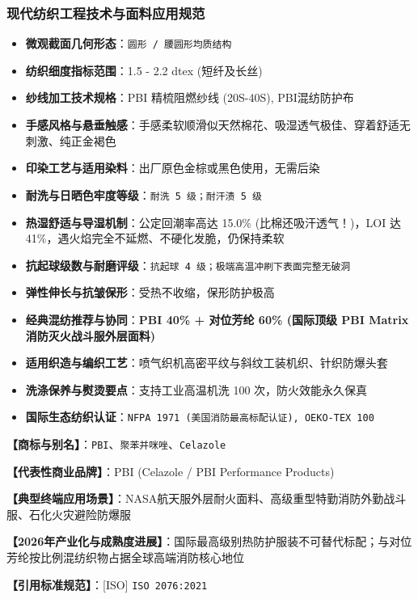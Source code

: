 \documentclass[11pt,openright,twoside,UTF8]{ctexbook}
\begin{document}
\subsubsection*{现代纺织工程技术与面料应用规范}
\begin{itemize} \setlength{\itemsep}{2pt}
    \item \textbf{微观截面几何形态}：\texttt{圆形 / 腰圆形均质结构}
    \item \textbf{纺织细度指标范围}：1.5 - 2.2 dtex (短纤及长丝)
    \item \textbf{纱线加工技术规格}：PBI 精梳阻燃纱线 (20S-40S), PBI混纺防护布
    \item \textbf{手感风格与悬垂触感}：手感柔软顺滑似天然棉花、吸湿透气极佳、穿着舒适无刺激、纯正金褐色
    \item \textbf{印染工艺与适用染料}：出厂原色金棕或黑色使用，无需后染
    \item \textbf{耐洗与日晒色牢度等级}：\texttt{耐洗 5 级；耐汗渍 5 级}
    \item \textbf{热湿舒适与导湿机制}：公定回潮率高达 15.0\% (比棉还吸汗透气！)，LOI 达 41\%，遇火焰完全不延燃、不硬化发脆，仍保持柔软
    \item \textbf{抗起球级数与耐磨评级}：\texttt{抗起球 4 级；极端高温冲刷下表面完整无破洞}
    \item \textbf{弹性伸长与抗皱保形}：受热不收缩，保形防护极高
    \item \textbf{经典混纺推荐与协同}：\textbf{PBI 40\% + 对位芳纶 60\% (国际顶级 PBI Matrix 消防灭火战斗服外层面料)}
    \item \textbf{适用织造与编织工艺}：喷气织机高密平纹与斜纹工装机织、针织防爆头套
    \item \textbf{洗涤保养与熨烫要点}：支持工业高温机洗 100 次，防火效能永久保真
    \item \textbf{国际生态纺织认证}：\texttt{NFPA 1971 (美国消防最高标配认证), OEKO-TEX 100}
\end{itemize}
\vspace{0.2cm}

\noindent\textbf{【商标与别名】}：\texttt{PBI}、\texttt{聚苯并咪唑}、\texttt{Celazole}\par
\noindent\textbf{【代表性商业品牌】}：PBI (Celazole / PBI Performance Products)\par
\noindent\textbf{【典型终端应用场景】}：NASA航天服外层耐火面料、高级重型特勤消防外勤战斗服、石化火灾避险防爆服\par
\noindent\textbf{【2026年产业化与成熟度进展】}：国际最高级别热防护服装不可替代标配；与对位芳纶按比例混纺织物占据全球高端消防核心地位\par
\noindent\textbf{【引用标准规范】}：[ISO] \texttt{ISO 2076:2021}\par
\vspace{0.5cm}
\end{document}
